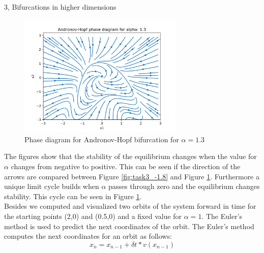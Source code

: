 \documentclass[10pt,a4paper]{article}
\begin{document}
\begin{task}{3, Bifurcations in higher dimensions}
\begin{figure}[H]
    \centering
    \includegraphics[width=0.7\textwidth]{../plots/Andronov_1,3.png}
    \caption{Phase diagram for Andronov-Hopf bifurcation for $\alpha =1.3 $}
    \label{fig:task3_1.3}
\end{figure}
The figures show that the stability of the equilibrium changes when the value for $\alpha$ changes from negative to positive. This can be seen if the direction of the arrows are compared between Figure \ref{fig:task3_-1.8} and Figure \ref{fig:task3_1.3}. Furthermore a unique limit cycle builds when $\alpha$ passes through zero and the equilibrium changes stability. This cycle can be seen in Figure \ref{fig:task3_1.3}.\\
Besides we computed and visualized two orbits of the system forward in time for the starting points (2,0) and (0.5,0) and a fixed value for $\alpha = 1$. The Euler's method is used to predict the next coordinates of the orbit. The Euler's method computes the next coordinates for an orbit as follows:
\begin{equation*}
    x_n = x_{n-1} + \delta t * v(x_{n-1})
\end{equation*}

\end{task}
\end{document}
